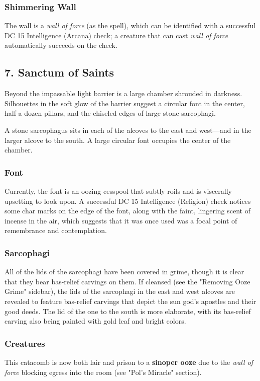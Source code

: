 \documentclass[10pt,a4paper,twoside,bg=print,twocolumn,openany,nodeprecatedcode]{dndbook}
\begin{document}
\subsubsection{Shimmering Wall}
The wall is a \textit{wall of force} (as the spell), which can be identified with a successful DC 15 Intelligence (Arcana) check; a creature that can cast \textit{wall of force} automatically succeeds on the check.

\subsection{7. Sanctum of Saints}
\begin{DndReadAloud}{}
Beyond the impassable light barrier is a large chamber shrouded in darkness. Silhouettes in the soft glow of the barrier suggest a circular font in the center, half a dozen pillars, and the chiseled edges of large stone sarcophagi.

\end{DndReadAloud}

A stone sarcophagus sits in each of the alcoves to the east and west—and in the larger alcove to the south. A large circular font occupies the center of the chamber.

\subsubsection{Font}
Currently, the font is an oozing cesspool that subtly roils and is viscerally upsetting to look upon. A successful DC 15 Intelligence (Religion) check notices some char marks on the edge of the font, along with the faint, lingering scent of incense in the air, which suggests that it was once used was a focal point of remembrance and contemplation.

\subsubsection{Sarcophagi}
All of the lids of the sarcophagi have been covered in grime, though it is clear that they bear bas-relief carvings on them. If cleansed (see the "Removing Ooze Grime" sidebar), the lids of the sarcophagi in the east and west alcoves are revealed to feature bas-relief carvings that depict the sun god's apostles and their good deeds. The lid of the one to the south is more elaborate, with its bas-relief carving also being painted with gold leaf and bright colors.

\subsubsection{Creatures}
This catacomb is now both lair and prison to a \textbf{sinoper ooze} due to the \textit{wall of force} blocking egress into the room (see "Pol's Miracle" section).
\end{document}
